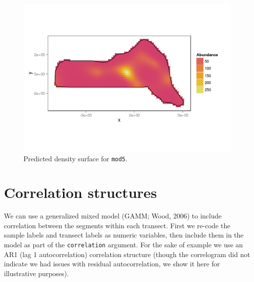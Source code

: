 \documentclass[]{amsart}
\makeatletter
\newenvironment{Shaded}{}{}
\newcommand{\KeywordTok}[1]{\textcolor[rgb]{0.00,0.44,0.13}{\textbf{{#1}}}}
\newcommand{\DataTypeTok}[1]{\textcolor[rgb]{0.56,0.13,0.00}{{#1}}}
\newcommand{\StringTok}[1]{\textcolor[rgb]{0.25,0.44,0.63}{{#1}}}
\newcommand{\NormalTok}[1]{{#1}}
\def\maxwidth{\ifdim\Gin@nat@width>\linewidth\linewidth
\else\Gin@nat@width\fi}
\let\Oldincludegraphics\includegraphics
\renewcommand{\includegraphics}[1]{\Oldincludegraphics[width=\maxwidth]{#1}}
\makeatother
\begin{document}
\begin{figure}[htbp]
\centering
\includegraphics{mexico-figs/mod5-pred.png}
\caption{Predicted density surface for \texttt{mod5}.}
\end{figure}

\section{Correlation structures}

We can use a generalized mixed model (GAMM; Wood, 2006) to include
correlation between the segments within each transect. First we re-code
the sample labels and transect labels as numeric variables, then include
them in the model as part of the \texttt{correlation} argument. For the
sake of example we use an AR1 (lag 1 autocorrelation) correlation
structure (though the correlogram did not indicate we had issues with
residual autocorrelation, we show it here for illustrative purposes).

\begin{Shaded}
\end{Shaded}
\end{document}

